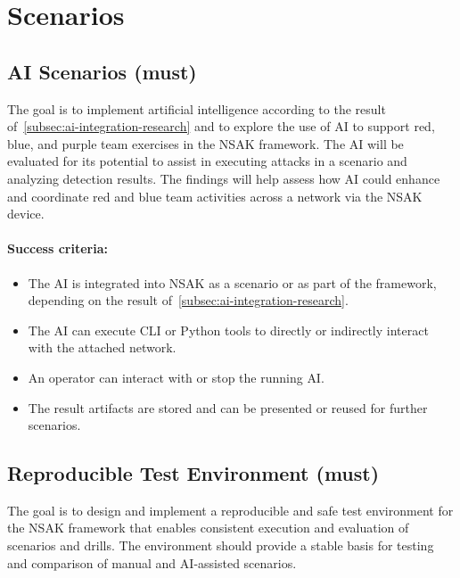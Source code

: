 \section{Scenarios}\label{sec:scenarios}

\subsection{\gls{AI} Scenarios (must)}\label{subsec:ai-scenarios}

The goal is to implement artificial intelligence according to the result of~\ref{subsec:ai-integration-research} and to explore the use of \gls{AI} to support red, blue, and purple team exercises in the \gls{NSAK} framework.
The \gls{AI} will be evaluated for its potential to assist in executing attacks in a scenario and analyzing detection results.
The findings will help assess how \gls{AI} could enhance and coordinate red and blue team activities across a network via the \gls{NSAK} device.

\paragraph{Success criteria:}

\begin{itemize}
	\item The \gls{AI} is integrated into \gls{NSAK} as a scenario or as part of the framework, depending on the result of~\ref{subsec:ai-integration-research}.
	\item The \gls{AI} can execute \gls{CLI} or Python tools to directly or indirectly interact with the attached network.
	\item An operator can interact with or stop the running \gls{AI}.
	\item The result artifacts are stored and can be presented or reused for further scenarios.
\end{itemize}

\subsection{Reproducible Test Environment (must)}\label{subsec:reproducible-test-environments}

The goal is to design and implement a reproducible and safe test environment for the \gls{NSAK} framework that enables consistent execution and evaluation of scenarios and drills.
The environment should provide a stable basis for testing and comparison of manual and \gls{AI}-assisted scenarios.

